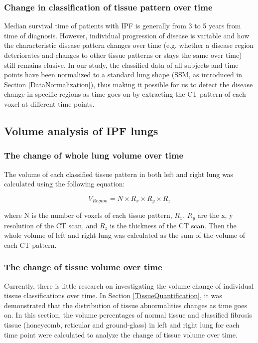 \subsubsection{Change in classification of tissue pattern over time}
Median survival time of patients with IPF is generally from 3 to 5 years from time of diagnosis. However, individual progression of disease is variable and how the characteristic disease pattern changes over time (e.g. whether a disease region deteriorates and changes to other tissue patterns or stays the same over time) still remains elusive. In our study, the classified data of all subjects and time points have been normalized to a standard lung shape (SSM, as introduced in Section \ref{DataNormalization}), thus making it possible for us to detect the disease change in specific regions as time goes on by extracting the CT pattern of each voxel at different time points.

\subsection{Volume analysis of IPF lungs} \label{VolumeAnalysis}
\subsubsection{The change of whole lung volume over time}
The volume of each classified tissue pattern in both left and right lung was calculated using the following equation:

\begin{equation}
V_{Region} = N \times R_x \times R_y \times R_z
\end{equation}

\noindent where N is the number of voxels of each tissue pattern, $R_{x}$, $R_{y}$ are the x, y resolution of the CT scan, and $R_{z}$ is the thickness of the CT scan. Then the whole volume of left and right lung was calculated as the sum of the volume of each CT pattern.

\subsubsection{The change of tissue volume over time}
Currently, there is little research on investigating the volume change of individual tissue classifications over time. In Section \ref{TissueQuantification}, it was demonstrated that the distribution of tissue abnormalities changes as time goes on. In this section, the volume percentages of normal tissue and classified fibrosis tissue (honeycomb, reticular and ground-glass) in left and right lung for each time point were calculated to analyze the change of tissue volume over time.

